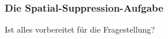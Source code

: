 \documentclass[11pt, twoside, a4paper]{book}		%
\begin{document}
\subsubsection*{Die Spatial-Suppression-Aufgabe}


Ist alles vorbereitet für die Fragestellung?




















%
%
%
%
%
%
\end{document}

